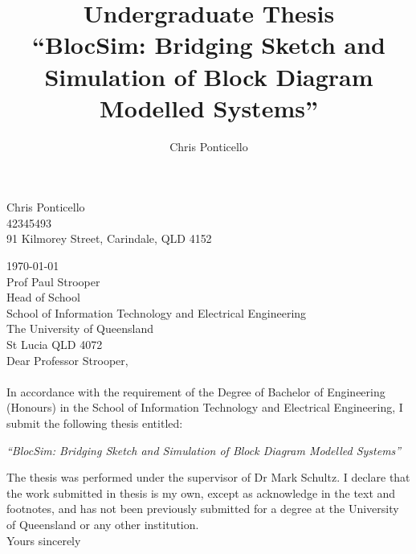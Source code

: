 \documentclass[titlesmallcaps, examinerscopy, copyrightpage]{uqthesis}
\begin{document}

\title{Undergraduate Thesis\\ \vspace{0.5 cm} ``BlocSim: Bridging Sketch and Simulation of Block Diagram Modelled Systems'' }
\author{Chris Ponticello}

\renewcommand{\degreetext}{in partial fulfilment of the Degree Bachelor of Engineering\\ in the
discipline of Computer Systems Engineering}

\frontmatter

\titlepage

\begin{flushright}
Chris Ponticello\\ 42345493\\ 91 Kilmorey Street, Carindale, QLD 4152\\
\end{flushright}

\noindent \today \\

\noindent Prof Paul Strooper\\
Head of School\\
School of Information Technology and Electrical Engineering\\
The University of  Queensland\\
St Lucia QLD 4072\\

\noindent Dear Professor Strooper,\\ \\
In accordance with the requirement of the Degree of Bachelor of Engineering (Honours) in the School
of Information Technology and Electrical Engineering, I submit the following thesis entitled:

\begin{center}
  \emph{``BlocSim: Bridging Sketch and Simulation of Block Diagram Modelled Systems''}
\end{center}

\noindent The thesis was performed under the supervisor of Dr Mark Schultz. I declare that the work
submitted in thesis is my own, except as acknowledge in the text and footnotes, and has not been
previously submitted for a degree at the University of Queensland or any other institution. \\

\noindent Yours sincerely \\ \\ 
\end{document}

